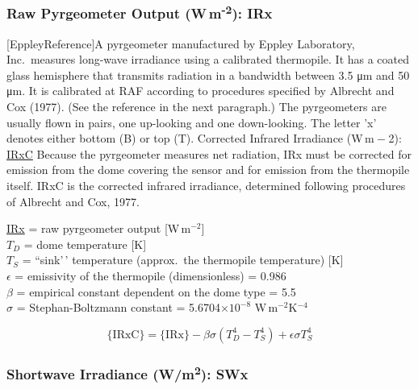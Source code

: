 \documentclass[
]{book}
\begin{document}
\hypertarget{irx}{%
\subsubsection*{\texorpdfstring{Raw Pyrgeometer Output (W m\textsuperscript{-2}): IRx}{Raw Pyrgeometer Output (W m-2): IRx}}\label{irx}}

\protect\hypertarget{EppleyReference}{}{{[}EppleyReference{]}}A pyrgeometer manufactured by Eppley Laboratory, Inc.~measures long-wave irradiance using a calibrated thermopile. It has a coated glass hemisphere that transmits radiation in a bandwidth between 3.5 {μm} and 50 {μm}. It is calibrated at RAF according to procedures specified by Albrecht and Cox (1977). (See the reference in the next paragraph.) The pyrgeometers are usually flown in pairs, one up-looking and one down-looking. The letter 'x' denotes either bottom (B) or top (T).
Corrected Infrared Irradiance (W m{ − 2}): \uline{IRxC}
Because the pyrgeometer measures net radiation, IRx must be corrected for emission from the dome covering the sensor and for emission from the thermopile itself. IRxC is the corrected infrared irradiance, determined following procedures of Albrecht and Cox, 1977.

\protect\hyperlink{irx}{IRx} = raw pyrgeometer output {[}W\(\,\)m\(^{-2}\){]}\\
\(T_{D}\) = dome temperature {[}K{]}\\
\(T_{S}\) = ``sink'\,' temperature (approx.~the thermopile temperature)
{[}K{]}\\
\(\epsilon\) = emissivity of the thermopile (dimensionless) = 0.986\\
\(\beta\) = empirical constant dependent on the dome type = 5.5\\
\(\sigma\) = Stephan-Boltzmann constant = 5.6704\(\times10^{-8}\) W\(\,\)m\(^{-2}\)K\(^{-4}\)

\begin{equation}
\mathrm{\{IRxC\}}=\mathrm{\{IRx\}}-\beta\sigma(T_{D}^{4}-T_{S}^{4})+\epsilon\sigma T_{S}^{4}
\label{eq:IRxTbox}
\end{equation}

\hypertarget{swx}{%
\subsubsection*{\texorpdfstring{Shortwave Irradiance (W/m\textsuperscript{2}): SWx}{Shortwave Irradiance (W/m2): SWx}}\label{swx}}
\end{document}
